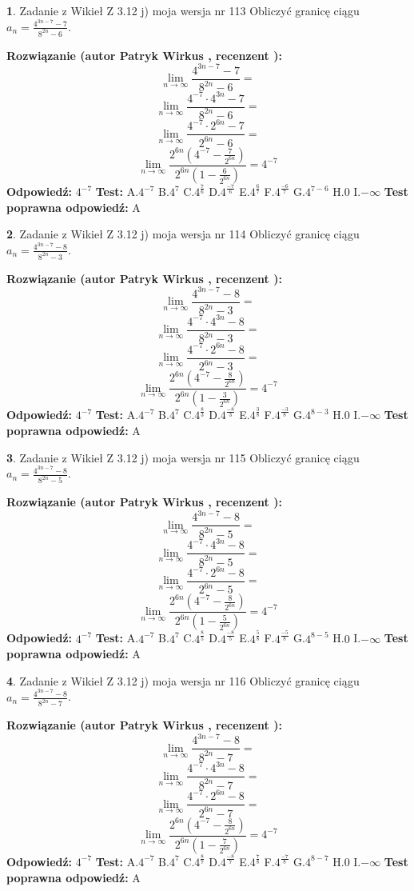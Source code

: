 \documentclass[12pt, a4paper]{article}
\theoremstyle{definition} %
\newtheorem{zad}{}
\newcommand{\zadStart}[1]{\begin{zad}#1\newline}
\newcommand{\zadStop}{\end{zad}}
\newcommand{\rozwStart}[2]{\noindent \textbf{Rozwiązanie (autor #1 , recenzent #2): }\newline}
\newcommand{\rozwStop}{\newline}
\newcommand{\odpStart}{\noindent \textbf{Odpowiedź:}\newline}
\newcommand{\odpStop}{\newline}
\newcommand{\testStart}{\noindent \textbf{Test:}\newline}
\newcommand{\testStop}{\newline}
\newcommand{\kluczStart}{\noindent \textbf{Test poprawna odpowiedź:}\newline}
\newcommand{\kluczStop}{\newline}
\begin{document}
\zadStart{Zadanie z Wikieł Z 3.12 j) moja wersja nr 113}
Obliczyć granicę ciągu $a_{n}=\frac{4^{3n-7}-7}{8^{2n}-6}$.
\zadStop
\rozwStart{Patryk Wirkus}{}
$$\lim\limits_{n\to\infty}\frac{4^{3n-7}-7}{8^{2n}-6}=$$
$$\lim\limits_{n\to\infty}\frac{4^{-7} \cdot 4^{3n}-7}{8^{2n}-6}=$$
$$\lim\limits_{n\to\infty}\frac{4^{-7} \cdot 2^{6n}-7}{2^{6n}-6}=$$
$$\lim\limits_{n\to\infty}\frac{2^{6n}(4^{-7} - \frac{7}{2^{6n}})}{2^{6n}(1-\frac{6}{2^{6n}})}= 4^{-7}$$
\rozwStop
\odpStart
$4^{-7}$
\odpStop
\testStart
A.$4^{-7}$
B.$4^{7}$
C.$4^{\frac{7}{6}}$
D.$4^{\frac{-7}{6}}$
E.$4^{\frac{6}{7}}$
F.$4^{\frac{-6}{7}}$
G.$4^{7-6}$
H.$0$
I.$-\infty$
\testStop
\kluczStart
A
\kluczStop



\zadStart{Zadanie z Wikieł Z 3.12 j) moja wersja nr 114}
Obliczyć granicę ciągu $a_{n}=\frac{4^{3n-7}-8}{8^{2n}-3}$.
\zadStop
\rozwStart{Patryk Wirkus}{}
$$\lim\limits_{n\to\infty}\frac{4^{3n-7}-8}{8^{2n}-3}=$$
$$\lim\limits_{n\to\infty}\frac{4^{-7} \cdot 4^{3n}-8}{8^{2n}-3}=$$
$$\lim\limits_{n\to\infty}\frac{4^{-7} \cdot 2^{6n}-8}{2^{6n}-3}=$$
$$\lim\limits_{n\to\infty}\frac{2^{6n}(4^{-7} - \frac{8}{2^{6n}})}{2^{6n}(1-\frac{3}{2^{6n}})}= 4^{-7}$$
\rozwStop
\odpStart
$4^{-7}$
\odpStop
\testStart
A.$4^{-7}$
B.$4^{7}$
C.$4^{\frac{8}{3}}$
D.$4^{\frac{-8}{3}}$
E.$4^{\frac{3}{8}}$
F.$4^{\frac{-3}{8}}$
G.$4^{8-3}$
H.$0$
I.$-\infty$
\testStop
\kluczStart
A
\kluczStop



\zadStart{Zadanie z Wikieł Z 3.12 j) moja wersja nr 115}
Obliczyć granicę ciągu $a_{n}=\frac{4^{3n-7}-8}{8^{2n}-5}$.
\zadStop
\rozwStart{Patryk Wirkus}{}
$$\lim\limits_{n\to\infty}\frac{4^{3n-7}-8}{8^{2n}-5}=$$
$$\lim\limits_{n\to\infty}\frac{4^{-7} \cdot 4^{3n}-8}{8^{2n}-5}=$$
$$\lim\limits_{n\to\infty}\frac{4^{-7} \cdot 2^{6n}-8}{2^{6n}-5}=$$
$$\lim\limits_{n\to\infty}\frac{2^{6n}(4^{-7} - \frac{8}{2^{6n}})}{2^{6n}(1-\frac{5}{2^{6n}})}= 4^{-7}$$
\rozwStop
\odpStart
$4^{-7}$
\odpStop
\testStart
A.$4^{-7}$
B.$4^{7}$
C.$4^{\frac{8}{5}}$
D.$4^{\frac{-8}{5}}$
E.$4^{\frac{5}{8}}$
F.$4^{\frac{-5}{8}}$
G.$4^{8-5}$
H.$0$
I.$-\infty$
\testStop
\kluczStart
A
\kluczStop



\zadStart{Zadanie z Wikieł Z 3.12 j) moja wersja nr 116}
Obliczyć granicę ciągu $a_{n}=\frac{4^{3n-7}-8}{8^{2n}-7}$.
\zadStop
\rozwStart{Patryk Wirkus}{}
$$\lim\limits_{n\to\infty}\frac{4^{3n-7}-8}{8^{2n}-7}=$$
$$\lim\limits_{n\to\infty}\frac{4^{-7} \cdot 4^{3n}-8}{8^{2n}-7}=$$
$$\lim\limits_{n\to\infty}\frac{4^{-7} \cdot 2^{6n}-8}{2^{6n}-7}=$$
$$\lim\limits_{n\to\infty}\frac{2^{6n}(4^{-7} - \frac{8}{2^{6n}})}{2^{6n}(1-\frac{7}{2^{6n}})}= 4^{-7}$$
\rozwStop
\odpStart
$4^{-7}$
\odpStop
\testStart
A.$4^{-7}$
B.$4^{7}$
C.$4^{\frac{8}{7}}$
D.$4^{\frac{-8}{7}}$
E.$4^{\frac{7}{8}}$
F.$4^{\frac{-7}{8}}$
G.$4^{8-7}$
H.$0$
I.$-\infty$
\testStop
\kluczStart
A
\kluczStop
\end{document}

